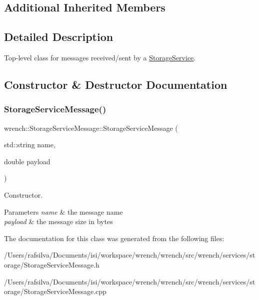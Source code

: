 \subsection*{Additional Inherited Members}


\subsection{Detailed Description}
Top-\/level class for messages received/sent by a \hyperlink{classwrench_1_1_storage_service}{Storage\+Service}. 

\subsection{Constructor \& Destructor Documentation}
\mbox{\label{classwrench_1_1_storage_service_message_ae6ff83dfa5ca6b8355d1666944260f29}} 
\subsubsection{\texorpdfstring{Storage\+Service\+Message()}{StorageServiceMessage()}}
{\footnotesize\ttfamily wrench\+::\+Storage\+Service\+Message\+::\+Storage\+Service\+Message (\begin{DoxyParamCaption}\item[{std\+::string}]{name,  }\item[{double}]{payload }\end{DoxyParamCaption})\hspace{0.3cm}{\ttfamily [protected]}}



Constructor. 


\begin{DoxyParams}{Parameters}
{\em name} & the message name \\
\hline
{\em payload} & the message size in bytes \\
\hline
\end{DoxyParams}


The documentation for this class was generated from the following files\+:\begin{DoxyCompactItemize}
\item 
/\+Users/rafsilva/\+Documents/isi/workspace/wrench/wrench/src/wrench/services/storage/Storage\+Service\+Message.\+h\item 
/\+Users/rafsilva/\+Documents/isi/workspace/wrench/wrench/src/wrench/services/storage/Storage\+Service\+Message.\+cpp\end{DoxyCompactItemize}
